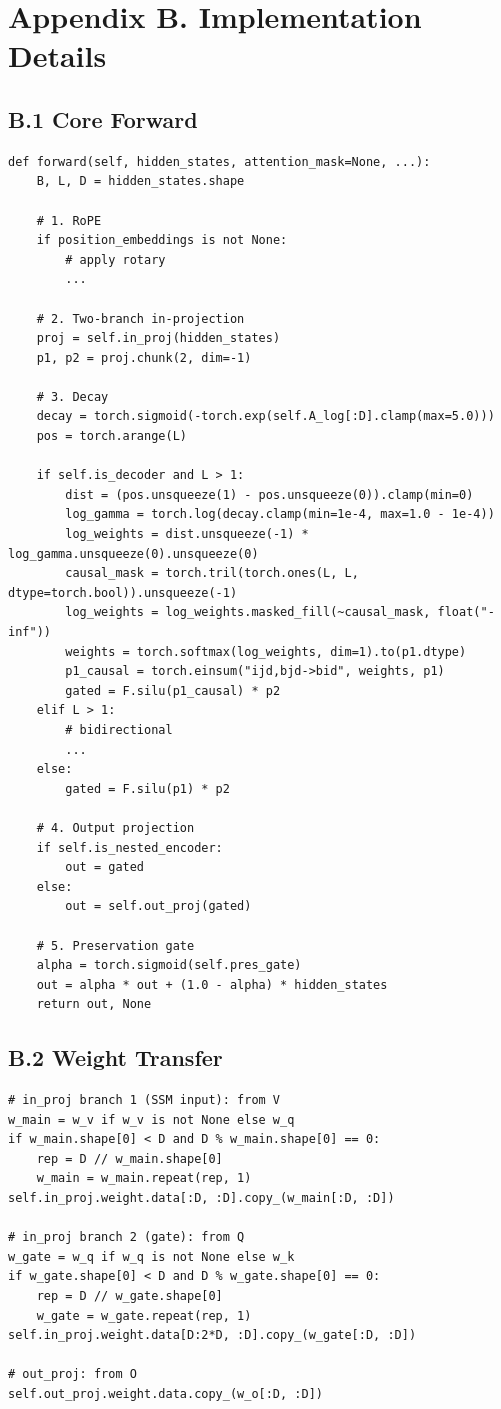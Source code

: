 \section{Appendix B. Implementation Details}

\subsection{B.1 Core Forward}

\begin{lstlisting}
def forward(self, hidden_states, attention_mask=None, ...):
    B, L, D = hidden_states.shape
    
    # 1. RoPE
    if position_embeddings is not None:
        # apply rotary
        ...
    
    # 2. Two-branch in-projection
    proj = self.in_proj(hidden_states)
    p1, p2 = proj.chunk(2, dim=-1)
    
    # 3. Decay
    decay = torch.sigmoid(-torch.exp(self.A_log[:D].clamp(max=5.0)))
    pos = torch.arange(L)
    
    if self.is_decoder and L > 1:
        dist = (pos.unsqueeze(1) - pos.unsqueeze(0)).clamp(min=0)
        log_gamma = torch.log(decay.clamp(min=1e-4, max=1.0 - 1e-4))
        log_weights = dist.unsqueeze(-1) * log_gamma.unsqueeze(0).unsqueeze(0)
        causal_mask = torch.tril(torch.ones(L, L, dtype=torch.bool)).unsqueeze(-1)
        log_weights = log_weights.masked_fill(~causal_mask, float("-inf"))
        weights = torch.softmax(log_weights, dim=1).to(p1.dtype)
        p1_causal = torch.einsum("ijd,bjd->bid", weights, p1)
        gated = F.silu(p1_causal) * p2
    elif L > 1:
        # bidirectional
        ...
    else:
        gated = F.silu(p1) * p2
    
    # 4. Output projection
    if self.is_nested_encoder:
        out = gated
    else:
        out = self.out_proj(gated)
    
    # 5. Preservation gate
    alpha = torch.sigmoid(self.pres_gate)
    out = alpha * out + (1.0 - alpha) * hidden_states
    return out, None
\end{lstlisting}

\subsection{B.2 Weight Transfer}

\begin{lstlisting}
# in_proj branch 1 (SSM input): from V
w_main = w_v if w_v is not None else w_q
if w_main.shape[0] < D and D % w_main.shape[0] == 0:
    rep = D // w_main.shape[0]
    w_main = w_main.repeat(rep, 1)
self.in_proj.weight.data[:D, :D].copy_(w_main[:D, :D])

# in_proj branch 2 (gate): from Q
w_gate = w_q if w_q is not None else w_k
if w_gate.shape[0] < D and D % w_gate.shape[0] == 0:
    rep = D // w_gate.shape[0]
    w_gate = w_gate.repeat(rep, 1)
self.in_proj.weight.data[D:2*D, :D].copy_(w_gate[:D, :D])

# out_proj: from O
self.out_proj.weight.data.copy_(w_o[:D, :D])
\end{lstlisting}

